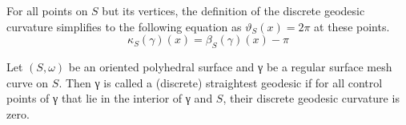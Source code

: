 \documentclass{stdlocal}
\begin{document}
  For all points on $S$ but its vertices, the definition of the discrete geodesic curvature simplifies to the following equation as $ϑ_S(x) = 2π$ at these points.
  \[
    κ_S(γ)(x) = β_S(γ)(x) - π
  \]

  \begin{definition}
    Let $(S,ω)$ be an oriented polyhedral surface and γ be a regular surface mesh curve on $S$.
    Then γ is called a (discrete) straightest geodesic if for all control points of γ that lie in the interior of γ and $S$, their discrete geodesic curvature is zero.
  \end{definition}





\end{document}
